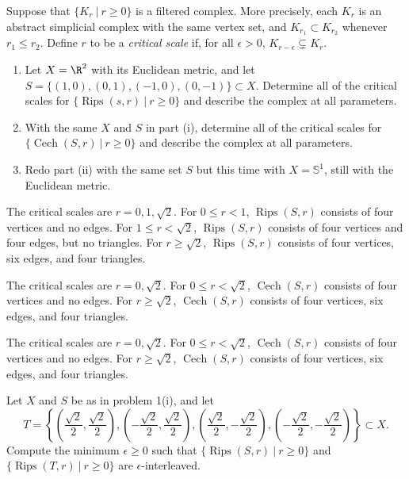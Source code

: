 \newcommand\Rips{\operatorname{Rips}}
\newcommand\Cech{\operatorname{Cech}}
\renewcommand\S{\mathbb{S}}

\begin{problem}[1]
  Suppose that $\{K_r~|~r \ge 0\}$ is a filtered complex. More precisely, each $K_r$  is an abstract simplicial complex with the same vertex set, and $K_{r_1} \subset K_{r_2}$ whenever $r_1 \le r_2$. Define $r$ to be a \textit{critical scale} if, for all $\epsilon > 0$, $K_{r-\epsilon} \subsetneq K_r$.
  \begin{enumerate}
    \item Let $X = \R^2$ with its Euclidean metric, and let $S = \{(1, 0), (0, 1), (-1, 0), (0, -1)\} \subset X$. Determine all of the critical scales for $\{\Rips(s, r)~|~r \ge 0\}$ and describe the complex at all parameters.
    \item With the same $X$ and $S$ in part (i), determine all of the critical scales for $\{\Cech(S, r)~|~r \ge 0\}$ and describe the complex at all parameters.
    \item Redo part (ii) with the same set $S$ but this time with $X = \S^1$, still with the Euclidean metric.
  \end{enumerate}
\end{problem}

\begin{solution}[(i)]
  The critical scales are $r = 0, 1, \sqrt{2}$. For $0 \le r < 1$, $\Rips(S, r)$ consists of four vertices and no edges. For $1 \le r < \sqrt{2}$, $\Rips(S, r)$ consists of four vertices and four edges, but no triangles. For $r \ge \sqrt{2}$, $\Rips(S, r)$ consists of four vertices, six edges, and four triangles.
\end{solution}

\begin{solution}[(ii)]
  The critical scales are $r = 0, \sqrt{2}$. For $0 \le r < \sqrt{2}$, $\Cech(S, r)$ consists of four vertices and no edges. For $r \ge \sqrt{2}$, $\Cech(S, r)$ consists of four vertices, six edges, and four triangles.
\end{solution}

\begin{solution}[(iii)]
  The critical scales are $r = 0, \sqrt{2}$. For $0 \le r < \sqrt{2}$, $\Cech(S, r)$ consists of four vertices and no edges. For $r \ge \sqrt{2}$, $\Cech(S, r)$ consists of four vertices, six edges, and four triangles.
\end{solution}

\begin{problem}[2]
  Let $X$ and $S$ be as in problem 1(i), and let
  \[%
    T = \left\{
      \left(\frac{\sqrt{2}}{2}, \frac{\sqrt{2}}{2}\right),
      \left(-\frac{\sqrt{2}}{2}, \frac{\sqrt{2}}{2}\right),
      \left(\frac{\sqrt{2}}{2}, -\frac{\sqrt{2}}{2}\right),
      \left(-\frac{\sqrt{2}}{2}, -\frac{\sqrt{2}}{2}\right)
    \right\} \subset X
  .\]%
  Compute the minimum $\epsilon \ge 0$ such that $\{\Rips(S, r)~|~r \ge 0\}$ and $\{\Rips(T, r)~|~r \ge 0\}$ are $\epsilon$-interleaved.
\end{problem}

